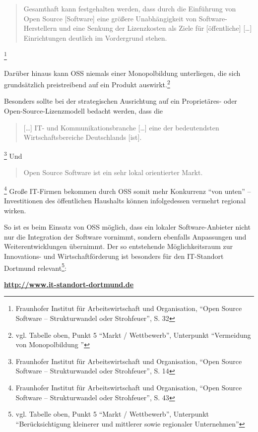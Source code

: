 \documentclass[a4paper]{scrartcl}
\begin{document}
\begin{quote}Gesamthaft kann festgehalten werden, dass durch die Einführung von
  Open Source [Software] eine größere Unabhängigkeit von Software-Herstellern
  und eine Senkung der Lizenzkosten als Ziele für [öffentliche] [\ldots]
  Einrichtungen deutlich im Vordergrund stehen.\end{quote}\footnote{Fraunhofer
  Institut für Arbeitswirtschaft und Organisation, ``Open Source Software --
  Strukturwandel oder Strohfeuer'', S. 32}

Darüber hinaus kann OSS niemals einer Monopolbildung unterliegen, die sich
grundsätzlich preistreibend auf ein Produkt auswirkt.\footnote{vgl. Tabelle
  oben, Punkt 5 ``Markt / Wettbewerb'', Unterpunkt ``Vermeidung von
  Monopolbildung ''}

Besonders sollte bei der strategischen Ausrichtung auf ein
Proprietäres- oder Open-Source-Lizenzmodell bedacht werden, dass die
\begin{quote} [\ldots] IT- und Kommunikationsbranche [\ldots] eine der
  bedeutendsten Wirtschaftsbereiche Deutschlands [ist].\end{quote}\footnote{Fraunhofer
  Institut für Arbeitswirtschaft und Organisation, ``Open Source Software --
  Strukturwandel oder Strohfeuer'', S. 14} Und
\begin{quote}Open Source Software ist ein sehr lokal orientierter
  Markt.\end{quote}\footnote{Fraunhofer Institut für Arbeitswirtschaft und
  Organisation, ``Open Source Software -- Strukturwandel oder Strohfeuer'',
  S. 43} Große IT-Firmen bekommen durch OSS somit mehr Konkurrenz ``von unten''
-- Investitionen des öffentlichen Haushalts können infolgedessen vermehrt
regional wirken.

So ist es beim Einsatz von OSS möglich, dass ein lokaler Software-Anbieter nicht
nur die Integration der Software vornimmt, sondern ebenfalls Anpassungen und
Weiterentwicklungen übernimmt. Der so entstehende Möglichkeitsraum zur
Innovations- und Wirtschaftförderung ist besonders für den IT-Standort Dortmund
relevant\footnote{vgl.  Tabelle oben, Punkt 5 ``Markt / Wettbewerb'', Unterpunkt
  ``Berücksichtigung kleinerer und mittlerer sowie regionaler Unternehmen''}:

{\centering
\href{http://www.it-standort-dortmund.de/}{{\textbf{http://}}}\href{http://www.it-standort-dortmund.de/}{{\textbf{www.it-standort-dortmund.de}}}
}

{ }
\end{document}
